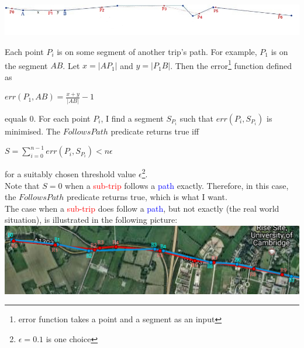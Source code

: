 \documentclass[12pt,a4paper,oneside,openright]{report}
\begin{document}
\includegraphics[width=\textwidth]{figs/follows_exactly.jpg}

Each point $P_i$ is on some segment of another trip's path.
For example, $P_1$ is on the segment $AB$.
Let $x = |AP_1|$ and $y = |P_1B|$. Then the
error\footnote{error function takes a point and a segment as an input} function
defined as \\

\begin{centering}
$err(P_1, AB) = \frac{x + y}{|AB|} - 1$ \\
\end{centering}

\:
\:
\:

equals $0$. For each point $P_i$, I find a segment $S_{P_i}$ such that
$err(P_i, S_{P_i})$ is minimised. The $FollowsPath$ predicate returns true
iff

\begin{centering}
    $S = \sum_{i=0}^{n-1} err(P_i, S_{P_i}) < n\epsilon$ \\
\end{centering}

\:
\:
\:

for a suitably chosen threshold value $\epsilon$\footnote{$\epsilon = 0.1$
is one choice}. \\

Note that $S = 0$ when a \textcolor{red}{sub-trip} follows a
\textcolor{blue}{path} exactly. Therefore, in this case, the $FollowsPath$
predicate returns true, which is what I want. \\

The case when a \textcolor{red}{sub-trip} does follow a
\textcolor{blue}{path}, but not exactly (the real world situation), 
is illustrated in the following picture: \\

\includegraphics[width=\textwidth]{figs/follows_roughly.png}
\end{document}

